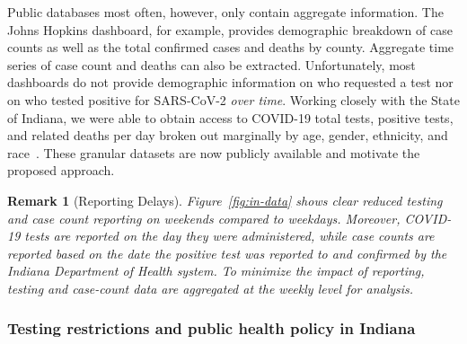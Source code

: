 \documentclass[11pt]{amsart}
\numberwithin{equation}{section}
\theoremstyle{plain}
\newtheorem{remark}{Remark}
\begin{document}
 Public databases most often, however, only contain aggregate information.  The Johns Hopkins dashboard, for example, provides demographic breakdown of case counts as well as the total confirmed cases and deaths by county.  Aggregate time series of case count and deaths can also be extracted.  Unfortunately, most dashboards do not provide demographic information on who requested a test nor on who tested positive for SARS-CoV-2 \emph{over time}. Working closely with the State of Indiana, we were able to obtain access to COVID-19 total tests, positive tests, and related deaths per day broken out marginally by age, gender, ethnicity, and race~\citep{IndianaData2021}.  These granular datasets are now publicly available and motivate the proposed approach.

\begin{remark}[Reporting Delays]
Figure~\ref{fig:in-data} shows clear reduced testing and case count reporting on weekends compared to weekdays. Moreover, COVID-19 tests are reported on the day they were administered, while case counts are reported based on the date the positive test was reported to and confirmed by the Indiana Department of Health system.  To minimize the impact of reporting, testing and case-count data are aggregated at the weekly level for analysis.
 \end{remark}


 \subsubsection{Testing restrictions and public health policy in Indiana}
 \label{section:publicpolicyindiana}
\end{document}
